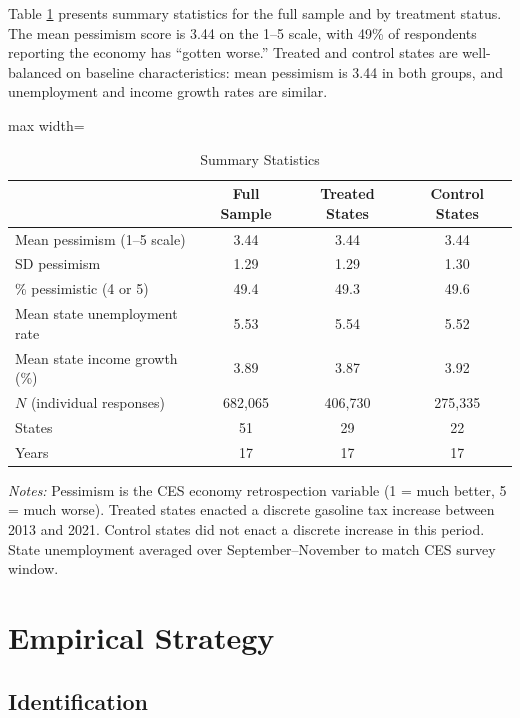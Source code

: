 \documentclass[12pt]{article}
\begin{document}
Table \ref{tab:summary} presents summary statistics for the full sample and by treatment status. The mean pessimism score is 3.44 on the 1--5 scale, with 49\% of respondents reporting the economy has ``gotten worse.'' Treated and control states are well-balanced on baseline characteristics: mean pessimism is 3.44 in both groups, and unemployment and income growth rates are similar.

\begin{table}[H]
\centering
\caption{Summary Statistics}
\label{tab:summary}
\begin{threeparttable}
\begin{adjustbox}{max width=\textwidth}
\begin{tabular}{lccc}
\toprule
& Full Sample & Treated States & Control States \\
\midrule
Mean pessimism (1--5 scale) & 3.44 & 3.44 & 3.44 \\
SD pessimism & 1.29 & 1.29 & 1.30 \\
\% pessimistic (4 or 5) & 49.4 & 49.3 & 49.6 \\
Mean state unemployment rate & 5.53 & 5.54 & 5.52 \\
Mean state income growth (\%) & 3.89 & 3.87 & 3.92 \\
\midrule
$N$ (individual responses) & 682,065 & 406,730 & 275,335 \\
States & 51 & 29 & 22 \\
Years & 17 & 17 & 17 \\
\bottomrule
\end{tabular}
\end{adjustbox}
\begin{tablenotes}[flushleft]
\small
\item \textit{Notes:} Pessimism is the CES economy retrospection variable (1 = much better, 5 = much worse). Treated states enacted a discrete gasoline tax increase between 2013 and 2021. Control states did not enact a discrete increase in this period. State unemployment averaged over September--November to match CES survey window.
\end{tablenotes}
\end{threeparttable}
\end{table}

\section{Empirical Strategy}

\subsection{Identification}
\end{document}
